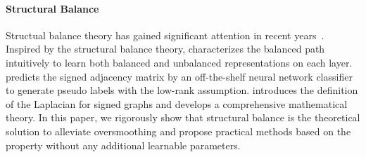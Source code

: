 \paragraph{Structural Balance}
Structual balance theory has gained significant attention in recent years~\citep{signedgraph,yan2022two,LRGNN,acmp}. 
%
Inspired by the structural balance theory, \cite{signedgraph} characterizes the balanced path intuitively to learn both balanced and unbalanced representations on each layer.
%
\cite{LRGNN} predicts the signed adjacency matrix by an off-the-shelf neural network classifier to generate pseudo labels with the low-rank assumption.
\cite{signed_dynamics_paper_review} introduces the definition of the Laplacian for signed graphs and develops a comprehensive mathematical theory.
%
In this paper, we rigorously show that structural balance is the theoretical solution to alleviate oversmoothing and propose practical methods based on the property without any additional learnable parameters. 





